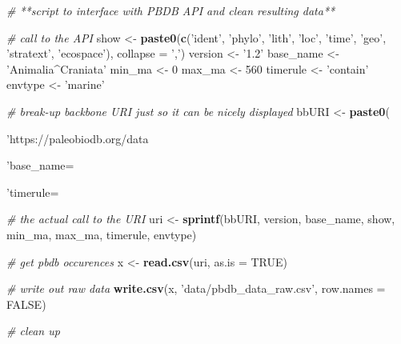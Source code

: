 \documentclass[]{article}
\newenvironment{Shaded}{\begin{snugshade}}{\end{snugshade}}
\newcommand{\KeywordTok}[1]{\textcolor[rgb]{0.13,0.29,0.53}{\textbf{#1}}}
\newcommand{\DataTypeTok}[1]{\textcolor[rgb]{0.13,0.29,0.53}{#1}}
\newcommand{\DecValTok}[1]{\textcolor[rgb]{0.00,0.00,0.81}{#1}}
\newcommand{\StringTok}[1]{\textcolor[rgb]{0.31,0.60,0.02}{#1}}
\newcommand{\CommentTok}[1]{\textcolor[rgb]{0.56,0.35,0.01}{\textit{#1}}}
\newcommand{\OtherTok}[1]{\textcolor[rgb]{0.56,0.35,0.01}{#1}}
\newcommand{\NormalTok}[1]{#1}
\begin{document}
\begin{Shaded}
\begin{Highlighting}[]
\CommentTok{# **script to interface with PBDB API and clean resulting data**}

\CommentTok{# call to the API}
\NormalTok{show <-}\StringTok{ }\KeywordTok{paste0}\NormalTok{(}\KeywordTok{c}\NormalTok{(}\StringTok{'ident'}\NormalTok{, }\StringTok{'phylo'}\NormalTok{, }\StringTok{'lith'}\NormalTok{, }\StringTok{'loc'}\NormalTok{, }\StringTok{'time'}\NormalTok{, }\StringTok{'geo'}\NormalTok{, }\StringTok{'stratext'}\NormalTok{,}
                 \StringTok{'ecospace'}\NormalTok{),}
               \DataTypeTok{collapse =} \StringTok{','}\NormalTok{)}
\NormalTok{version <-}\StringTok{ '1.2'}
\NormalTok{base_name <-}\StringTok{ 'Animalia^Craniata'}
\NormalTok{min_ma <-}\StringTok{ }\DecValTok{0}
\NormalTok{max_ma <-}\StringTok{ }\DecValTok{560}
\NormalTok{timerule <-}\StringTok{ 'contain'}
\NormalTok{envtype <-}\StringTok{ 'marine'}

\CommentTok{# break-up backbone URI just so it can be nicely displayed}
\NormalTok{bbURI <-}\StringTok{ }\KeywordTok{paste0}\NormalTok{(}\StringTok{'https://paleobiodb.org/data%s/occs/list.csv?'}\NormalTok{,}
                \StringTok{'base_name=%s&show=%s&limit=all&min_ma=%s&max_ma=%s&'}\NormalTok{,}
                \StringTok{'timerule=%s&envtype=%s'}\NormalTok{)}

\CommentTok{# the actual call to the URI}
\NormalTok{uri <-}\StringTok{ }\KeywordTok{sprintf}\NormalTok{(bbURI,}
\NormalTok{               version,}
\NormalTok{               base_name,}
\NormalTok{               show,}
\NormalTok{               min_ma,}
\NormalTok{               max_ma,}
\NormalTok{               timerule,}
\NormalTok{               envtype)}

\CommentTok{# get pbdb occurences}
\NormalTok{x <-}\StringTok{ }\KeywordTok{read.csv}\NormalTok{(uri, }\DataTypeTok{as.is =} \OtherTok{TRUE}\NormalTok{)}

\CommentTok{# write out raw data}
\KeywordTok{write.csv}\NormalTok{(x, }\StringTok{'data/pbdb_data_raw.csv'}\NormalTok{, }\DataTypeTok{row.names =} \OtherTok{FALSE}\NormalTok{)}


\CommentTok{# clean up}

}}}
\end{Highlighting}
\end{Shaded}
\end{document}
